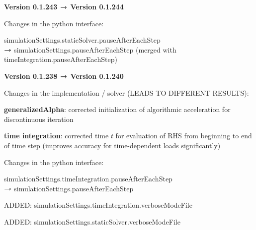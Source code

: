 	\ei
 	\item {\bf Version 0.1.243 $\rightarrow$ Version 0.1.244}
	\item[] Changes in the python interface:
	\bi \ttfamily
	  \item simulationSettings.staticSolver.pauseAfterEachStep \\$\rightarrow$ simulationSettings.pauseAfterEachStep (merged with timeIntegration.pauseAfterEachStep)
	\ei
	\item {\bf Version 0.1.238 $\rightarrow$ Version 0.1.240}
	\item[] Changes in the implementation / solver (LEADS TO DIFFERENT RESULTS):
	\bi
	  \item {\bf generalizedAlpha}: corrected initialization of algorithmic acceleration for discontinuous iteration
		\item {\bf time integration}: corrected time $t$ for evaluation of RHS from beginning to end of time step (improves accuracy for time-dependent loads significantly)
	\ei
	\item[] Changes in the python interface:
	\bi \ttfamily
	  \item simulationSettings.timeIntegration.pauseAfterEachStep \\$\rightarrow$ simulationSettings.pauseAfterEachStep 
		\item ADDED: simulationSettings.timeIntegration.verboseModeFile
		\item ADDED: simulationSettings.staticSolver.verboseModeFile
	\ei
\ei
